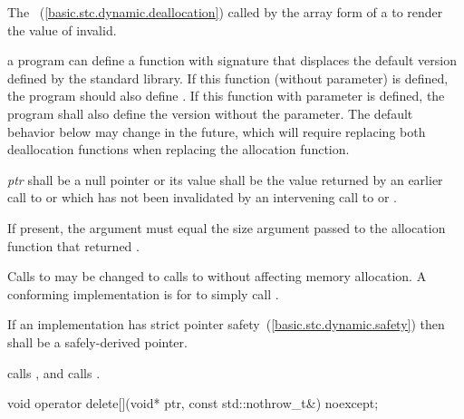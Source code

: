 \begin{itemdescr}
\pnum
\effects
The
~(\ref{basic.stc.dynamic.deallocation})
called by the array form of a
to render the value of  invalid.

\pnum
\replaceable
a \Cpp program can define a function with signature
 that displaces the default
version defined by the \Cpp standard library. If this function (without 
parameter) is defined, the program should also define
. If this function
with  parameter is defined, the program shall also define the version
without the  parameter.
\enternote The default behavior below may change in the future, which will require
replacing both deallocation functions when replacing the allocation function. \exitnote

\pnum
\requires
\textit{ptr} shall be a null pointer or its value shall be
the value returned by an earlier call to
or
which has not been invalidated by an intervening call to
 or
.

\pnum
\requires If present, the  argument must equal the size
argument passed to the allocation function that returned .

\pnum
\required Calls to  may be changed
to calls to  without affecting memory allocation.
\enternote A conforming implementation is for
 to simply call
. \exitnote

\pnum
\requires
If an implementation has strict pointer safety~(\ref{basic.stc.dynamic.safety})
then  shall be a safely-derived pointer.

\pnum
{}
{} calls
, and
 calls
.
\end{itemdescr}

%
\begin{itemdecl}
void operator delete[](void* ptr, const std::nothrow_t&) noexcept;
\end{itemdecl}

